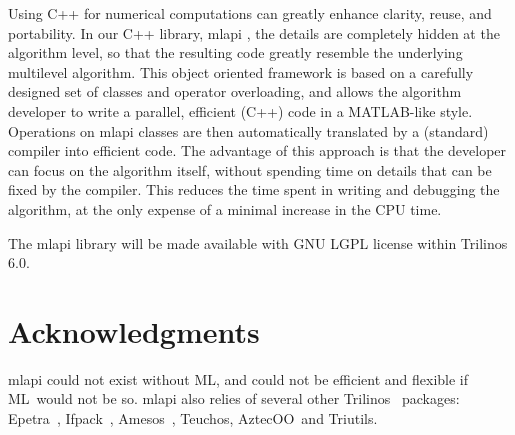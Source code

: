 \documentclass{article}[11pt]
\newcommand{\Aztecoo}  {{\sc AztecOO}}
\newcommand{\aztecoo}  {{\Aztecoo}}
\newcommand{\epetra}  {{\sc Epetra}}
\newcommand{\ML}     {{\sc ML}}
\newcommand{\trilinos}  {{\sc Trilinos}}
\newcommand{\amesos}  {{\sc Amesos}}
\newcommand{\triutils}  {{\sc Triutils}}
\newcommand{\ifpack}  {{\sc Ifpack}}
\newcommand{\teuchos}  {{\sc Teuchos}}
\newcommand{\MLAPI}  {{\sc mlapi }}
\begin{document}
Using C++ for numerical computations can greatly enhance clarity, reuse, and
portability. In our C++  library, \MLAPI, the details are completely hidden at
the algorithm level, so that the resulting code greatly resemble the 
underlying multilevel algorithm. This object oriented framework is based on a
carefully designed set of classes and operator overloading, and allows the
algorithm developer to write a parallel, efficient (C++) code in a MATLAB-like
style. Operations on \MLAPI classes are then automatically translated by a
(standard) compiler into efficient code.  The advantage of this approach is
that the developer can focus on the algorithm itself, without spending time on
details that can be fixed by the compiler. This reduces the time spent in
writing and debugging the algorithm, at the only expense of a minimal increase
in the CPU time.

\smallskip

The \MLAPI library will be made available with GNU LGPL license within
Trilinos 6.0.

\section*{Acknowledgments}
\label{sec:acks}

\MLAPI could not exist without \ML, and could not be efficient and flexible if 
\ML\ would not be so. \MLAPI also relies of several other
\trilinos~\cite{Trilinos-home-page} packages:
\epetra~\cite{epetra-guide}, \ifpack~\cite{ifpack-guide}, 
\amesos~\cite{amesos-guide}, \teuchos, \aztecoo\ and \triutils. 



\end{document}
